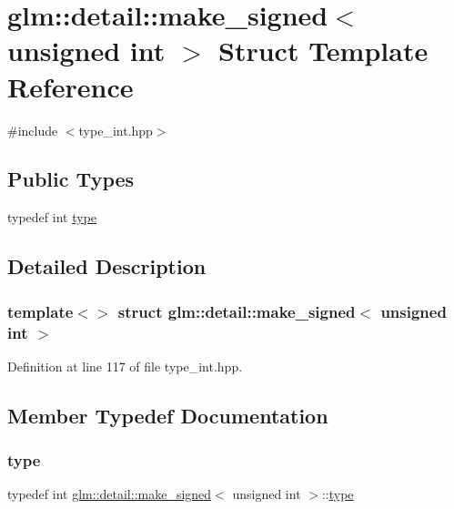 \hypertarget{structglm_1_1detail_1_1make__signed_3_01unsigned_01int_01_4}{}\section{glm\+::detail\+::make\+\_\+signed$<$ unsigned int $>$ Struct Template Reference}
\label{structglm_1_1detail_1_1make__signed_3_01unsigned_01int_01_4}


{\ttfamily \#include $<$type\+\_\+int.\+hpp$>$}

\subsection*{Public Types}
\begin{DoxyCompactItemize}
\item 
typedef int \mbox{\hyperlink{structglm_1_1detail_1_1make__signed_3_01unsigned_01int_01_4_a78b4ada342bba40027f755d20eae141a}{type}}
\end{DoxyCompactItemize}


\subsection{Detailed Description}
\subsubsection*{template$<$$>$\newline
struct glm\+::detail\+::make\+\_\+signed$<$ unsigned int $>$}



Definition at line 117 of file type\+\_\+int.\+hpp.



\subsection{Member Typedef Documentation}
\mbox{\label{structglm_1_1detail_1_1make__signed_3_01unsigned_01int_01_4_a78b4ada342bba40027f755d20eae141a}} 
\subsubsection{\texorpdfstring{type}{type}}
{\footnotesize\ttfamily typedef int \mbox{\hyperlink{structglm_1_1detail_1_1make__signed}{glm\+::detail\+::make\+\_\+signed}}$<$ unsigned int $>$\+::\mbox{\hyperlink{structglm_1_1detail_1_1make__signed_3_01unsigned_01int_01_4_a78b4ada342bba40027f755d20eae141a}{type}}}



